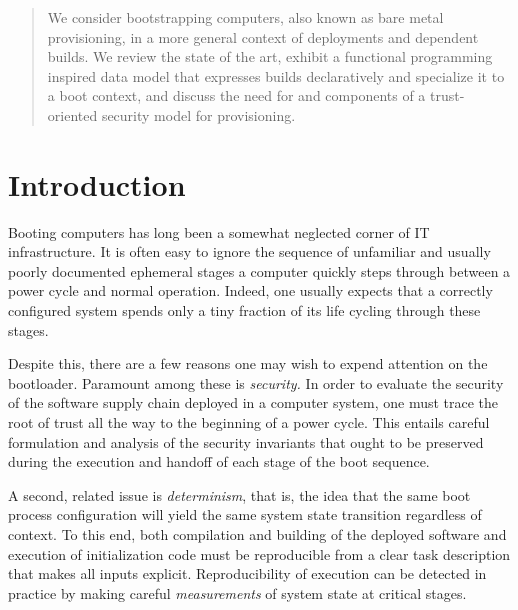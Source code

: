 \maketitle


\begin{abstract}

  We consider bootstrapping computers, also known as bare metal provisioning, in a more general context of deployments and dependent builds. We review the state of the art, exhibit a functional programming inspired data model that expresses builds declaratively and specialize it to a boot context, and discuss the need for and components of a trust-oriented security model for provisioning.

\end{abstract}

\section{Introduction}

Booting computers has long been a somewhat neglected corner of IT infrastructure. 
%
It is often easy to ignore the sequence of unfamiliar and usually poorly documented ephemeral stages a computer quickly steps through between a power cycle and normal operation. 
%
Indeed, one usually expects that a correctly configured system spends only a tiny fraction of its life cycling through these stages.

Despite this, there are a few reasons one may wish to expend attention on the bootloader. 
%
Paramount among these is \emph{security.} 
%
In order to evaluate the security of the software supply chain deployed in a computer system, one must trace the root of trust all the way to the beginning of a power cycle.
%
This entails careful formulation and analysis of the security invariants that ought to be preserved during the execution and handoff of each stage of the boot sequence. %

A second, related issue is \emph{determinism}, that is, the idea that the same boot process configuration will yield the same system state transition regardless of context.
%
To this end, both compilation and building of the deployed software and execution of initialization code must be reproducible from a clear task description that makes all inputs explicit.
%
Reproducibility of execution can be detected in practice by making careful \emph{measurements} of system state at critical stages.

